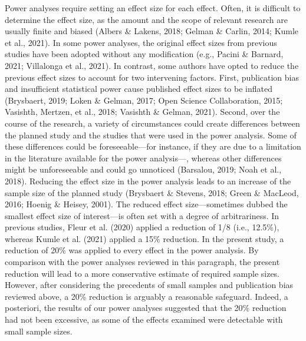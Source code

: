 \documentclass[
  12pt,
  man,floatsintext]{apa7}
\begin{document}
Power analyses require setting an effect size for each effect. Often, it is difficult to determine the effect size, as the amount and the scope of relevant research are usually finite and biased (Albers \& Lakens, 2018; Gelman \& Carlin, 2014; Kumle et al., 2021). In some power analyses, the original effect sizes from previous studies have been adopted without any modification (e.g., Pacini \& Barnard, 2021; Villalonga et al., 2021). In contrast, some authors have opted to reduce the previous effect sizes to account for two intervening factors. First, publication bias and insufficient statistical power cause published effect sizes to be inflated (Brysbaert, 2019; Loken \& Gelman, 2017; Open Science Collaboration, 2015; Vasishth, Mertzen, et al., 2018; Vasishth \& Gelman, 2021). Second, over the course of the research, a variety of circumstances could create differences between the planned study and the studies that were used in the power analysis. Some of these differences could be foreseeable---for instance, if they are due to a limitation in the literature available for the power analysis---, whereas other differences might be unforeseeable and could go unnoticed (Barsalou, 2019; Noah et al., 2018). Reducing the effect size in the power analysis leads to an increase of the sample size of the planned study (Brysbaert \& Stevens, 2018; Green \& MacLeod, 2016; Hoenig \& Heisey, 2001). The reduced effect size---sometimes dubbed the smallest effect size of interest---is often set with a degree of arbitrariness. In previous studies, Fleur et al. (2020) applied a reduction of 1/8 (i.e., 12.5\%), whereas Kumle et al. (2021) applied a 15\% reduction. In the present study, a reduction of 20\% was applied to every effect in the power analysis. By comparison with the power analyses reviewed in this paragraph, the present reduction will lead to a more conservative estimate of required sample sizes. However, after considering the precedents of small samples and publication bias reviewed above, a 20\% reduction is arguably a reasonable safeguard. Indeed, a posteriori, the results of our power analyses suggested that the 20\% reduction had not been excessive, as some of the effects examined were detectable with small sample sizes.
\end{document}
